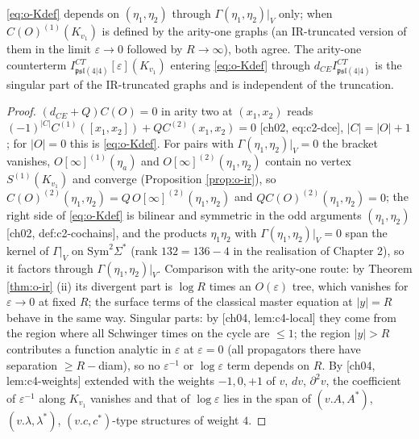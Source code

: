 \begin{proposition}
\label{prop:o-Kconsistent}
\eqref{eq:o-Kdef} depends on $(\eta_1,\eta_2)$ through $\Gamma(\eta_1,\eta_2)|_V$ only; when $C(O)^{(1)}(K_{v_1})$ is defined by the arity-one graphs (an IR-truncated version of them in the limit $\varepsilon\to0$ followed by $R\to\infty$), both agree. The arity-one counterterm $I^{CT}_{\mathfrak{psl}(4|4)}[\varepsilon](K_{v_1})$ entering \eqref{eq:o-Kdef} through $d_{CE}I^{CT}_{\mathfrak{psl}(4|4)}$ is the singular part of the IR-truncated graphs and is independent of the truncation.
\end{proposition}

\begin{proof}
$(d_{CE}+Q)C(O)=0$ in arity two at $(x_1,x_2)$ reads $(-1)^{|C|}C^{(1)}([x_1,x_2])+QC^{(2)}(x_1,x_2)=0$ [ch02, eq:c2-dce], $|C|=|O|+1$; for $|O|=0$ this is \eqref{eq:o-Kdef}. For pairs with $\Gamma(\eta_1,\eta_2)|_V=0$ the bracket vanishes, $O[\infty]^{(1)}(\eta_a)$ and $O[\infty]^{(2)}(\eta_1,\eta_2)$ contain no vertex $S^{(1)}(K_{v_1})$ and converge (Proposition \ref{prop:o-ir}), so $C(O)^{(2)}(\eta_1,\eta_2)=Q\,O[\infty]^{(2)}(\eta_1,\eta_2)$ and $QC(O)^{(2)}(\eta_1,\eta_2)=0$; the right side of \eqref{eq:o-Kdef} is bilinear and symmetric in the odd arguments $(\eta_1,\eta_2)$ [ch02, def:c2-cochains], and the products $\eta_1\eta_2$ with $\Gamma(\eta_1,\eta_2)|_V=0$ span the kernel of $\Gamma|_V$ on $\mathrm{Sym}^2\Sigma^*$ (rank $132=136-4$ in the realisation of Chapter 2), so it factors through $\Gamma(\eta_1,\eta_2)|_V$. Comparison with the arity-one route: by Theorem \ref{thm:o-ir} (ii) its divergent part is $\log R$ times an $O(\varepsilon)$ tree, which vanishes for $\varepsilon\to0$ at fixed $R$; the surface terms of the classical master equation at $|y|=R$ behave in the same way. Singular parts: by [ch04, lem:c4-local] they come from the region where all Schwinger times on the cycle are $\le1$; the region $|y|>R$ contributes a function analytic in $\varepsilon$ at $\varepsilon=0$ (all propagators there have separation $\ge R-$diam), so no $\varepsilon^{-1}$ or $\log\varepsilon$ term depends on $R$. By [ch04, lem:c4-weights] extended with the weights $-1,0,+1$ of $v$, $dv$, $\partial^2v$, the coefficient of $\varepsilon^{-1}$ along $K_{v_1}$ vanishes and that of $\log\varepsilon$ lies in the span of $(v.A,A^*)$, $(v.\lambda,\lambda^*)$, $(v.c,c^*)$-type structures of weight $4$.
\end{proof}

